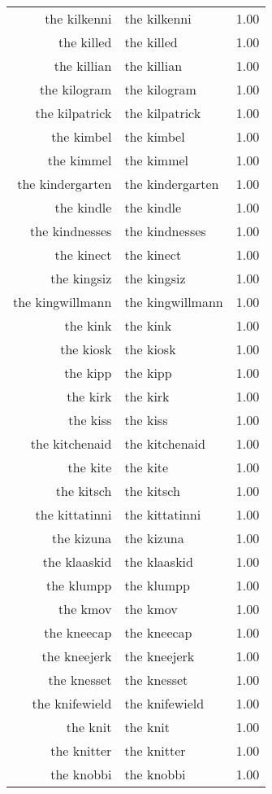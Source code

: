 \begin{table}[ht]
\begin{tabular}{rlr}
  the kilkenni & the kilkenni & 1.00 \\ 
  the killed & the killed & 1.00 \\ 
  the killian & the killian & 1.00 \\ 
  the kilogram & the kilogram & 1.00 \\ 
  the kilpatrick & the kilpatrick & 1.00 \\ 
  the kimbel & the kimbel & 1.00 \\ 
  the kimmel & the kimmel & 1.00 \\ 
  the kindergarten & the kindergarten & 1.00 \\ 
  the kindle & the kindle & 1.00 \\ 
  the kindnesses & the kindnesses & 1.00 \\ 
  the kinect & the kinect & 1.00 \\ 
  the kingsiz & the kingsiz & 1.00 \\ 
  the kingwillmann & the kingwillmann & 1.00 \\ 
  the kink & the kink & 1.00 \\ 
  the kiosk & the kiosk & 1.00 \\ 
  the kipp & the kipp & 1.00 \\ 
  the kirk & the kirk & 1.00 \\ 
  the kiss & the kiss & 1.00 \\ 
  the kitchenaid & the kitchenaid & 1.00 \\ 
  the kite & the kite & 1.00 \\ 
  the kitsch & the kitsch & 1.00 \\ 
  the kittatinni & the kittatinni & 1.00 \\ 
  the kizuna & the kizuna & 1.00 \\ 
  the klaaskid & the klaaskid & 1.00 \\ 
  the klumpp & the klumpp & 1.00 \\ 
  the kmov & the kmov & 1.00 \\ 
  the kneecap & the kneecap & 1.00 \\ 
  the kneejerk & the kneejerk & 1.00 \\ 
  the knesset & the knesset & 1.00 \\ 
  the knifewield & the knifewield & 1.00 \\ 
  the knit & the knit & 1.00 \\ 
  the knitter & the knitter & 1.00 \\ 
  the knobbi & the knobbi & 1.00 \\ 

\end{tabular}
\end{table}
